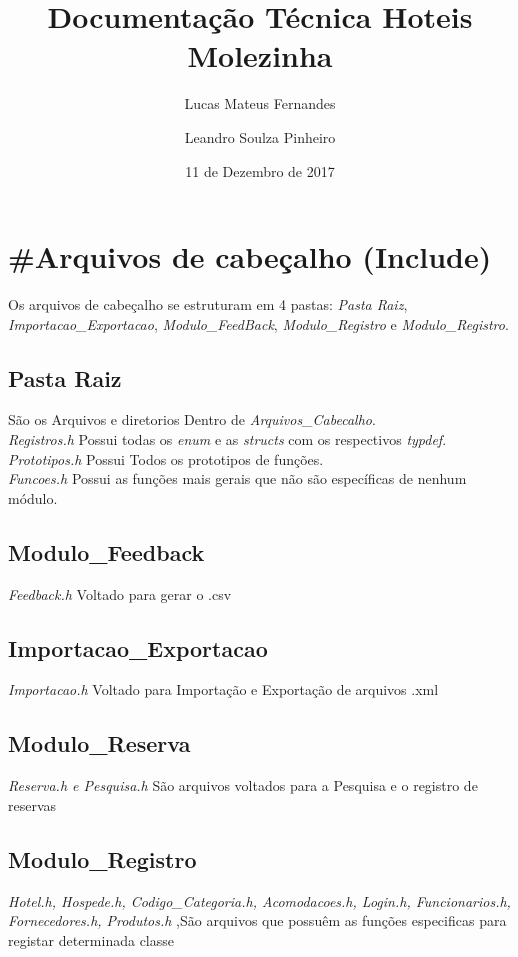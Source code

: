 \documentclass[titlepage]{article}
\title{Documentação Técnica Hoteis Molezinha}
\date{11 de Dezembro de 2017}
\author{Lucas Mateus Fernandes \and Leandro Soulza Pinheiro}
\begin{document}
	\maketitle
	\newpage
	\tableofcontents %
	\newpage


	\section{\#Arquivos de cabeçalho (Include)}
		Os arquivos de cabeçalho se estruturam em 4 pastas: \textit{ Pasta Raiz}, \textit{Importacao\_Exportacao}, \textit{Modulo\_FeedBack}, \textit{Modulo\_Registro} e \textit{Modulo\_Registro}.
		\subsection{Pasta Raiz}
			São os Arquivos e diretorios Dentro de  \textit{Arquivos\_Cabecalho}.\\
			\textit{Registros.h} Possui todas os  \textit{enum} e as \textit{structs} com os respectivos \textit{typdef}.\\
			\textit{Prototipos.h} Possui Todos os prototipos de funções.\\ 
			\textit{Funcoes.h} Possui as funções mais gerais que não são específicas de nenhum módulo.\\
		\subsection{Modulo\_Feedback}
			\textit{Feedback.h} Voltado para gerar o .csv\\
		\subsection{Importacao\_Exportacao}
			\textit{Importacao.h} Voltado para Importação e Exportação de arquivos .xml\\
		\subsection{Modulo\_Reserva}
			\textit{Reserva.h e Pesquisa.h} São arquivos voltados para a Pesquisa e o registro de reservas\\
		\subsection{Modulo\_Registro}
			\textit{Hotel.h, Hospede.h, Codigo\_Categoria.h, Acomodacoes.h, Login.h, Funcionarios.h, Fornecedores.h, Produtos.h} ,São arquivos que possuêm as funções especificas para registar determinada classe\\
\end{document}
